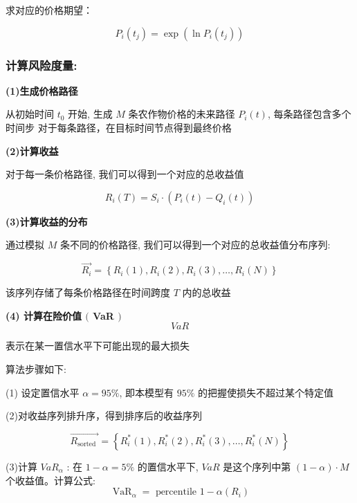 \documentclass[12pt]{ctexart}
\begin{document}
	
	求对应的价格期望：
	
	\begin{equation}
	P_i\left(t_j\right)=\exp \left(\ln P_i\left(t_j\right)\right)
	\end{equation}
	
	
	\subsubsection{计算风险度量:}
	
	
	\textbf{(1)生成价格路径}
	
	从初始时间 $t_0$ 开始, 生成 $M$ 条农作物价格的未来路径 $P_i(t)$,
	每条路径包含多个时间步
	对于每条路径，在目标时间节点得到最终价格
	
	
		\textbf{(2)计算收益}
	
	对于每一条价格路径, 我们可以得到一个对应的总收益值
	
		\begin{equation}
	R_i(T)=S_i \cdot\left(P_i(t)-Q_i(t)\right)
	\end{equation}


	\textbf{(3)计算收益的分布}
	
	通过模拟 $M$ 条不同的价格路径, 我们可以得到一个对应的总收益值分布序列:
	
		\begin{equation}
	\overrightarrow{R_i}=\left\{R_i(1), R_i(2), R_i(3), \ldots, R_i(N)\right\}
\end{equation}
	
	
	该序列存储了每条价格路径在时间跨度 $T$ 内的总收益
	
	
	\textbf{(4) 计算在险价值 $($ VaR $)$}
	\[V a R\]
	
	
	表示在某一置信水平下可能出现的最大损失
	
	
	算法步骤如下:
	
	
	(1) 设定置信水平 $\alpha=95 \%$, 即本模型有 $95 \%$ 的把握使损失不超过某个特定值
	
	
	(2)对收益序列排升序，得到排序后的收益序列
	
	
	\begin{equation}
	\overrightarrow{R_{\text {sorted }}}=\left\{R_i^*(1), R_i^*(2), R_i^*(3), \ldots, R_i^*(N)\right\}
\end{equation}


	(3)计算 $V a R_\alpha$ : 在 $1-\alpha=5 \%$ 的置信水平下, $V a R$ 是这个序列中第 $(1-\alpha) \cdot M$ 个收益值。计算公式:
		\begin{equation}
	\operatorname{VaR}_\alpha=\text { percentile } 1-\alpha\left(R_i\right)
\end{equation}
\end{document}
